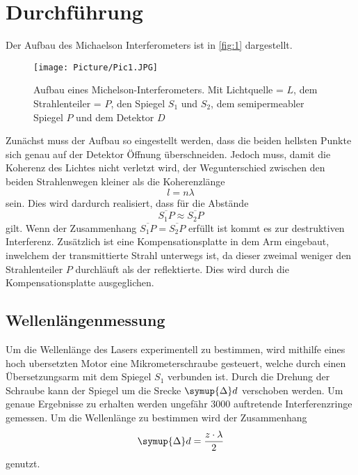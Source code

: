 \newpage
\section{Durchführung}
Der Aufbau des Michaelson Interferometers ist in \autoref{fig:1} dargestellt. 

\begin{figure}
    \centering
    \texttt{[image: Picture/Pic1.JPG]}
    \caption{Aufbau eines Michelson-Interferometers.
            Mit Lichtquelle = $L$, dem Strahlenteiler = $P$, den Spiegel $S_1$ und $S_2$, dem semipermeabler Spiegel $P$ und dem Detektor $D$}
    \label{fig:1}
  \end{figure}

Zunächst muss der Aufbau so eingestellt werden, dass die beiden hellsten Punkte sich genau auf der Detektor
Öffnung überschneiden. Jedoch muss, damit die Koherenz des Lichtes nicht verletzt wird, der Wegunterschied zwischen den beiden Strahlenwegen kleiner als die Koherenzlänge 
\begin{equation*}
    l = n \lambda
  \end{equation*}
\noindent
sein. Dies wird dardurch realisiert, dass für die Abstände 
\begin{equation*}
    \overline{S_1 P} \approx \overline{S_2 P}
    \label{eqn:close}
\end{equation*}
\noindent
gilt. Wenn der Zusammenhang $\overline{S_1 P} = \overline{S_2 P}$ erfüllt ist kommt es zur destruktiven Interferenz. Zusätzlich ist eine Kompensationsplatte in dem Arm eingebaut, 
inwelchem der transmittierte Strahl unterwegs ist, da dieser zweimal weniger den Strahlenteiler $P$ durchläuft als der reflektierte. Dies wird durch die Kompensationsplatte ausgeglichen.
\noindent


\subsection{Wellenlängenmessung}
Um die Wellenlänge des Lasers experimentell zu bestimmen, wird mithilfe eines hoch ubersetzten Motor eine Mikrometerschraube gesteuert, welche durch einen Übersetzungsarm mit dem 
Spiegel $S_1$ verbunden ist. Durch die Drehung der Schraube kann der Spiegel um die Srecke $\symup{\Delta} d$ verschoben werden. Um genaue Ergebnisse zu erhalten werden ungefähr 
3000 auftretende Interferenzringe gemessen. 
Um die Wellenlänge zu bestimmen wird der Zusammenhang
\begin{equation*}
    \symup{\Delta}d = \frac{z \cdot \lambda}{2}
    \label{eqn:d2}
\end{equation*}
\noindent
genutzt. 

